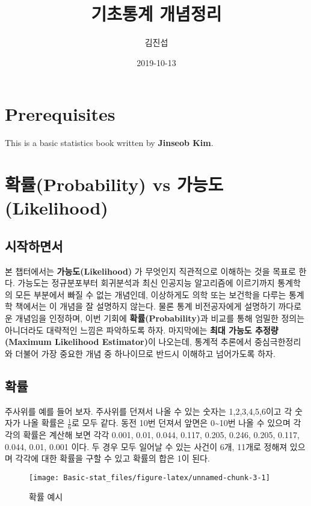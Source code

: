\documentclass[]{book}
\title{기초통계 개념정리}
\author{김진섭}
\date{2019-10-13}
\begin{document}
\maketitle

{
\setcounter{tocdepth}{1}
\tableofcontents
}
\chapter{Prerequisites}\label{prerequisites}

This is a basic statistics book written by \textbf{Jinseob Kim}.

\chapter{확률(Probability) vs
가능도(Likelihood)}\label{uxd655uxb960probability-vs-uxac00uxb2a5uxb3c4likelihood}

\section{시작하면서}\label{uxc2dcuxc791uxd558uxba74uxc11c}

본 챕터에서는 \textbf{가능도(Likelihood)} 가 무엇인지 직관적으로
이해하는 것을 목표로 한다. 가능도는 정규분포부터 회귀분석과 최신
인공지능 알고리즘에 이르기까지 통계학의 모든 부분에서 빠질 수 없는
개념인데, 이상하게도 의학 또는 보건학을 다루는 통계학 책에서는 이 개념을
잘 설명하지 않는다. 물론 통계 비전공자에게 설명하기 까다로운 개념임을
인정하며, 이번 기회에 \textbf{확률(Probability)}과 비교를 통해 엄밀한
정의는 아니더라도 대략적인 느낌은 파악하도록 하자. 마지막에는
\textbf{최대 가능도 추정량(Maximum Likelihood Estimator)}이 나오는데,
통계적 추론에서 중심극한정리와 더불어 가장 중요한 개념 중 하나이므로
반드시 이해하고 넘어가도록 하자.

\section{확률}\label{uxd655uxb960}

주사위를 예를 들어 보자. 주사위를 던져서 나올 수 있는 숫자는
1,2,3,4,5,6이고 각 숫자가 나올 확률은 \(\frac{1}{6}\)로 모두 같다. 동전
10번 던져서 앞면은 0\textasciitilde{}10번 나올 수 있으며 각각의 확률은
계산해 보면 각각 0.001, 0.01, 0.044, 0.117, 0.205, 0.246, 0.205, 0.117,
0.044, 0.01, 0.001 이다. 두 경우 모두 일어날 수 있는 사건이 6개, 11개로
정해져 있으며 각각에 대한 확률을 구할 수 있고 확률의 합은 1이 된다.

\begin{figure}

{\centering \texttt{[image: Basic-stat\_files/figure-latex/unnamed-chunk-3-1]} 

}

\caption{확률 예시}\label{fig:unnamed-chunk-3}
\end{figure}
\end{document}
